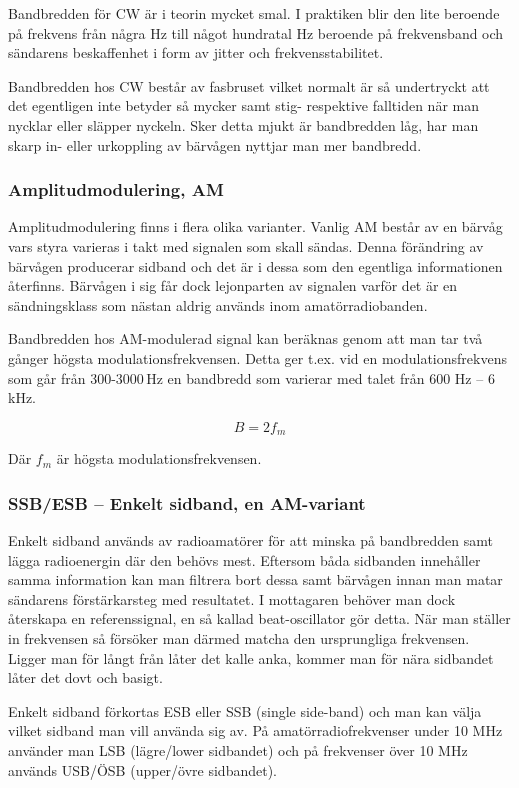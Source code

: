 Bandbredden för CW är i teorin mycket smal. I praktiken blir den lite beroende på frekvens från några Hz till något hundratal Hz beroende på frekvensband och sändarens beskaffenhet i form av jitter och frekvensstabilitet.

Bandbredden hos CW består av fasbruset vilket normalt är så undertryckt att det egentligen inte betyder så mycker samt stig- respektive falltiden när man nycklar eller släpper nyckeln. Sker detta mjukt är bandbredden låg, har man skarp in- eller urkoppling av bärvågen nyttjar man mer bandbredd.

\subsubsection{Amplitudmodulering, AM}

Amplitudmodulering finns i flera olika varianter. Vanlig AM består av en bärvåg vars styra varieras i takt med signalen som skall sändas. Denna förändring av bärvågen producerar sidband och det är i dessa som den egentliga informationen återfinns. Bärvågen i sig får dock lejonparten av signalen varför det är en sändningsklass som nästan aldrig används inom amatörradiobanden.

Bandbredden hos AM-modulerad signal kan beräknas genom att man tar två gånger högsta modulationsfrekvensen. Detta ger t.ex. vid en modulationsfrekvens som går från 300-3000\,Hz en bandbredd som varierar med talet från 600 Hz -- 6 kHz.

$$B=2f_m$$

Där $f_m$ är högsta modulationsfrekvensen.

\subsubsection{SSB/ESB -- Enkelt sidband, en AM-variant}

Enkelt sidband används av radioamatörer för att minska på bandbredden samt lägga radioenergin där den behövs mest. Eftersom båda sidbanden innehåller samma information kan man filtrera bort dessa samt bärvågen innan man matar sändarens förstärkarsteg med resultatet. I mottagaren behöver man dock återskapa en referenssignal, en så kallad beat-oscillator gör detta. När man ställer in frekvensen så försöker man därmed matcha den ursprungliga frekvensen. Ligger man för långt från låter det kalle anka, kommer man för nära sidbandet låter det dovt och basigt. 

Enkelt sidband förkortas ESB eller SSB (single side-band) och man kan välja vilket sidband man vill använda sig av. På amatörradiofrekvenser under 10 MHz använder man LSB (lägre/lower sidbandet) och på frekvenser över 10 MHz används USB/ÖSB (upper/övre sidbandet). 

